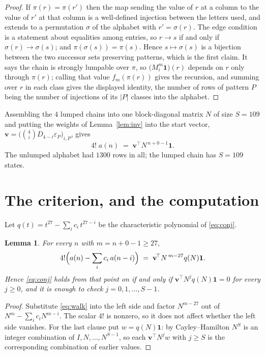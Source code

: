 \documentclass[11pt,a4paper]{article}
\theoremstyle{plain}
\newtheorem{lemma}[theorem]{Lemma}
\theoremstyle{definition}
\begin{document}
\begin{proof}
If $\pi(r)=\pi(r')$ then the map sending the value of $r$ at a column to the value of $r'$
at that column is a well-defined injection between the letters used, and extends to a
permutation $\sigma$ of the alphabet with $r'=\sigma(r)$. The edge condition is a statement
about equalities among entries, so $r\to s$ if and only if $\sigma(r)\to\sigma(s)$; and
$\pi(\sigma(s))=\pi(s)$. Hence $s\mapsto\sigma(s)$ is a bijection between the two successor
sets preserving patterns, which is the first claim. It says the chain is strongly lumpable
over $\pi$, so $\bigl(M_i^{m}\mathbf{1}\bigr)(r)$ depends on $r$ only through $\pi(r)$;
calling that value $f_m(\pi(r))$ gives the recursion, and summing over $r$ in each class
gives the displayed identity, the number of rows of pattern $P$ being the number of
injections of its $|P|$ classes into the alphabet.
\end{proof}

Assembling the $4$ lumped chains into one block-diagonal matrix $N$ of size $S=109$ and
putting the weights of Lemma~\ref{lem:inv} into the start vector,
$\mathbf{v}=\bigl(\binom{4}{i}D_{4-i}\varepsilon_P\bigr)_{i,P}$, gives
\begin{equation}\label{eq:walk}
4!\;a(n)\;=\;\mathbf{v}^{\!\top}N^{\,n+0-1}\mathbf{1} .
\end{equation}
The unlumped alphabet had $1300$ rows in all; the lumped chain has $S=109$ states.

\section{The criterion, and the computation}

Let $q(t)=t^{27}-\sum_i c_i\,t^{27-i}$ be the characteristic polynomial of
\eqref{eq:conj}.

\begin{lemma}\label{lem:crit}
For every $n$ with $m=n+0-1\ge27$,
\[
4!\Bigl(a(n)-\sum_i c_i\,a(n-i)\Bigr)\;=\;\mathbf{v}^{\!\top}N^{\,m-27}q(N)\mathbf{1} .
\]
Hence \eqref{eq:conj} holds from that point on if and only if
$\mathbf{v}^{\!\top}N^{j}q(N)\mathbf{1}=0$ for every $j\ge0$, and it is enough to check
$j=0,1,\dots,S-1$.
\end{lemma}

\begin{proof}
Substitute \eqref{eq:walk} into the left side and factor $N^{m-27}$ out of
$N^{m}-\sum_i c_iN^{m-i}$. The scalar $4!$ is nonzero, so it does not affect whether
the left side vanishes. For the last clause put $w=q(N)\mathbf{1}$: by Cayley--Hamilton
$N^{S}$ is an integer combination of $I,N,\dots,N^{S-1}$, so each
$\mathbf{v}^{\!\top}N^{j}w$ with $j\ge S$ is the corresponding combination of earlier
values.
\end{proof}
\end{document}
